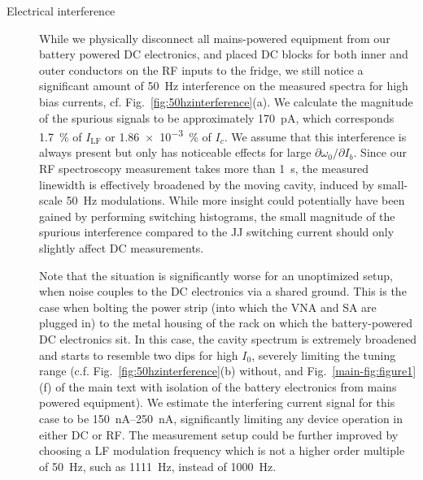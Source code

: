 \begin{description}
	\item[Electrical interference] While we physically disconnect all mains-powered equipment from our battery powered DC electronics, and placed DC blocks for both inner and outer conductors on the RF inputs to the fridge, we still notice a significant amount of \SI{50}{\hertz} interference on the measured spectra for high bias currents, cf. Fig.~\ref{fig:50hzinterference}(a).
	We calculate the magnitude of the spurious signals to be approximately \SI{170}{\pico\ampere}, which corresponds \SI{1.7}{\percent} of $I_\text{LF}$ or \SI{1.86e-3}{\percent} of $I_c$.
	We assume that this interference is always present but only has noticeable effects for large $\partial\omega_0/\partial I_b$.
	Since our RF spectroscopy measurement takes more than \SI{1}{\second}, the measured linewidth is effectively broadened by the moving cavity, induced by small-scale \SI{50}{\hertz} modulations.
	While more insight could potentially have been gained by performing switching histograms, the small magnitude of the spurious interference compared to the JJ switching current should only slightly affect DC measurements.
	
	Note that the situation is significantly worse for an unoptimized setup, when noise couples to the DC electronics via a shared ground.
	This is the case when bolting the power strip (into which the VNA and SA are plugged in) to the metal housing of the rack on which the battery-powered DC electronics sit.
	In this case, the cavity spectrum is extremely broadened and starts to resemble two dips for high $I_0$, severely limiting the tuning range (c.f. Fig.~\ref{fig:50hzinterference}(b) without, and Fig.~\ref{main-fig:figure1}(f) of the main text with isolation of the battery electronics from mains powered equipment).
	We estimate the interfering current signal for this case to be \SIrange{150}{250}{\nano\ampere}, significantly limiting any device operation in either DC or RF.
	The measurement setup could be further improved by choosing a LF modulation frequency which is not a higher order multiple of \SI{50}{\hertz}, such as \SI{1111}{\hertz}, instead of \SI{1000}{\hertz}.
	

\end{description}
